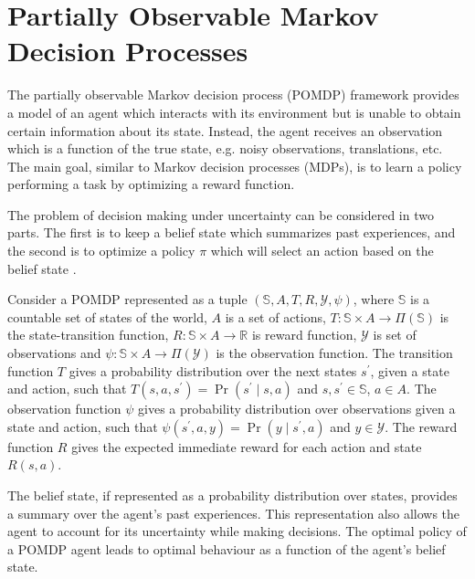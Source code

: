 \section{Partially Observable Markov Decision Processes}
\label{sec:belief_POMDP}
The partially observable Markov decision process (POMDP) framework provides a model of an agent which interacts with its environment but is unable to obtain certain information about its state. Instead, the agent receives an observation which is a function of the true state, e.g. noisy observations, translations, etc. The main goal, similar to Markov decision processes (MDPs), is to learn a policy performing a task by optimizing a reward function. \par
The problem of decision making under uncertainty can be considered in two parts. The first is to keep a belief state which summarizes past experiences, and the second is to optimize a policy $ \pi $ which will select an action based on the belief state \cite{KAELBLING199899,Murphy2000}.\par
Consider a POMDP represented as a tuple $ (\mathbb{S}, A, T, R, \mathcal{Y}, \psi) $, where $ \mathbb{S} $ is a countable set of states of the world, $ A $ is a set of actions, $ T: \mathbb{S} \times A \rightarrow \varPi(\mathbb{S}) $ is the state-transition function, $ R: \mathbb{S}\times A \rightarrow \mathbb{R} $ is reward function, $ \mathcal{Y} $ is set of observations and $ \psi:\mathbb{S}\times A \rightarrow \varPi(\mathcal{Y})$ is the observation function. The transition function $ T $ gives a probability distribution over the next states $ s^\prime $, given a state and action, such that $ T(s, a, s^\prime) = \operatorname{Pr}(s^\prime \mid s, a) $ and $ s, s^\prime\in \mathbb{S} $, $ a \in A $. The observation function $ \psi $ gives a probability distribution over observations given a state and action, such that $ \psi(s^\prime, a, y) = \operatorname{Pr}(y \mid s^\prime, a) $ and $ y \in \mathcal{Y} $. The reward function $ R $ gives the expected immediate reward for each action and state $ R(s,a) $.\par
The belief state, if represented as a probability distribution over states, provides a summary over the agent's past experiences. This representation also allows the agent to account for its uncertainty while making decisions. The optimal policy of a POMDP agent leads to optimal behaviour as a function of the agent's belief state. %
